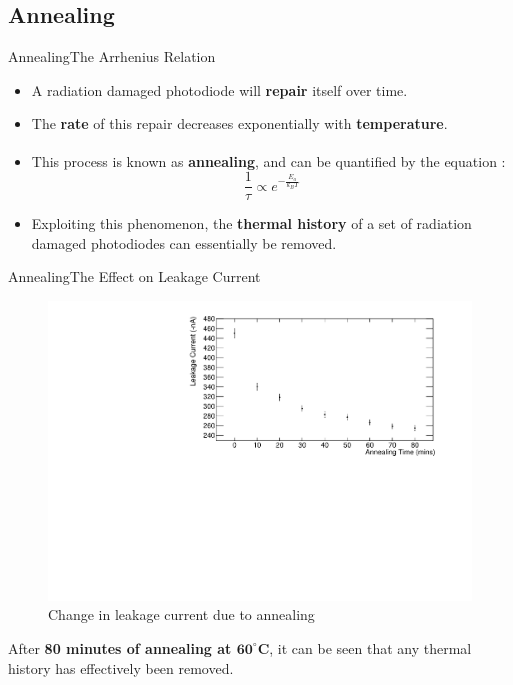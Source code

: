 \documentclass{beamer}
\begin{document}
\subsection{Annealing}    

    \begin{frame}{Annealing}{The Arrhenius Relation}
        \begin{itemize}
            \item A radiation damaged photodiode will \textbf{repair} itself over time.
            \item The \textbf{rate} of this repair decreases exponentially with \textbf{temperature}.
            \item This process is known as \textbf{annealing}, and can be quantified by the equation \textsuperscript{\cite{Moll}}:
                \begin{equation*}
                    \frac{1}{\tau} \propto e^{-\frac{E_a}{k_BT}}
                \end{equation*}
            \item Exploiting this phenomenon, the \textbf{thermal history} of a set of radiation damaged photodiodes can essentially be removed.
        \end{itemize}
    \end{frame}
    
    \begin{frame}{Annealing}{The Effect on Leakage Current}
        \begin{figure}
            \centering
            \includegraphics[width = 0.8\linewidth]{Diode5_annealing_10min_increments_2411.pdf}
            \caption{\scriptsize Change in leakage current due to annealing}
        \end{figure}
        \vspace{-0.5cm}
        After \textbf{80 minutes of annealing at $\bm{60^{\circ}}$C}, it can be seen that any thermal history has effectively been removed.
    \end{frame}
    
\end{document}
